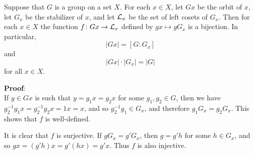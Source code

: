 \documentclass[12pt]{article}
\begin{document}
Suppose that $G$ is a group  on a set $X$.
For each $x\in X$, let $Gx$ be the orbit of $x$,
let $G_x$ be the stabilizer of $x$,
and let ${\cal L}_x$ be the set of left cosets of $G_x$.
Then for each $x\in X$ the function $f\colon Gx\to{\cal L}_x$
defined by $gx\mapsto gG_x$ is a bijection.
In particular,
\[
  |Gx| = [G:G_x]
\]
and
\[
  |Gx|\cdot|G_x| = |G|
\]
for all $x\in X$.

{\bf Proof}:\\
If $y\in Gx$ is such that $y=g_1x=g_2x$ for some $g_1,g_2\in G$,
then we have $g_2^{-1}g_1x=g_2^{-1}g_2x=1x=x$, and so $g_2^{-1}g_1\in G_x$,
and therefore $g_1G_x=g_2G_x$.
This shows that $f$ is well-defined.

It is clear that $f$ is surjective.
If $gG_x = g'G_x$, then $g = g'h$ for some $h \in G_x$,
and so $gx = (g'h)x= g'(hx) = g'x$.
Thus $f$ is also injective.
\end{document}
